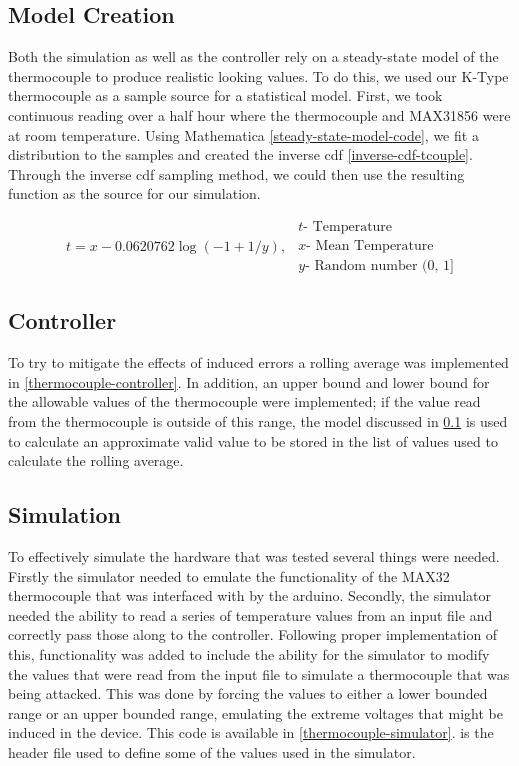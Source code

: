 \subsection{Model Creation}\label{model-creation}
Both the simulation as well as the controller rely on a steady-state model of the thermocouple to produce realistic looking values. To do this, we used our K-Type thermocouple as a sample source for a statistical model. First, we took continuous reading over a half hour where the thermocouple and MAX31856 were at room temperature. Using Mathematica \cref{steady-state-model-code}, we fit a distribution to the samples and created the inverse \ac{cdf} \cref{inverse-cdf-tcouple}. Through the inverse \ac{cdf} sampling method, we could then use the resulting function as the source for our simulation. 

\begin{equation}\label{inverse-cdf-tcouple}
\begin{split}
t = x - 0.0620762 \log({-1 + 1/y}),
\end{split}
\begin{split}
t \text{- Temperature}\\
x \text{- Mean Temperature}\\
y \text{- Random number (0, 1]}
\end{split}
\end{equation}

\subsection{Controller}
To try to mitigate the effects of induced errors a rolling average was implemented in \cref{thermocouple-controller}. In addition, an upper bound and lower bound for the allowable values of the thermocouple were implemented; if the value read from the thermocouple is outside of this range, the model discussed in \cref{model-creation} is used to calculate an approximate valid value to be stored in the list of values used to calculate the rolling average.

\subsection{Simulation}
To effectively simulate the hardware that was tested several things were needed. Firstly the simulator needed to emulate the functionality of the MAX32 thermocouple that was interfaced with by the arduino. Secondly, the simulator needed the ability to read a series of temperature values from an input file and correctly pass those along to the controller. Following proper implementation of this, functionality was added to include the ability for the simulator to modify the values that were read from the input file to simulate a thermocouple that was being attacked. This was done by forcing the values to either a lower bounded range or an upper bounded range, emulating the extreme voltages that might be induced in the device. This code is available in \cref{thermocouple-simulator}.  is the header file used to define some of the values used in the simulator.

